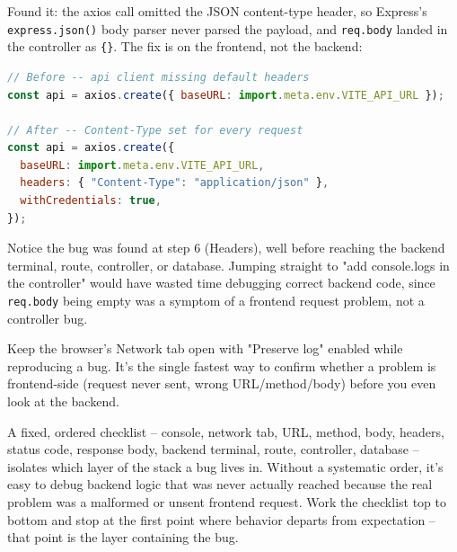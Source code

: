 Found it: the axios call omitted the JSON content-type header, so Express's
\texttt{express.json()} body parser never parsed the payload, and
\texttt{req.body} landed in the controller as \texttt{\{\}}. The fix is on
the frontend, not the backend:

\begin{lstlisting}[language=JavaScript]
// Before -- api client missing default headers
const api = axios.create({ baseURL: import.meta.env.VITE_API_URL });

// After -- Content-Type set for every request
const api = axios.create({
  baseURL: import.meta.env.VITE_API_URL,
  headers: { "Content-Type": "application/json" },
  withCredentials: true,
});
\end{lstlisting}

\begin{warnbox}[WARNING]
Notice the bug was found at step 6 (Headers), well before reaching the
backend terminal, route, controller, or database. Jumping straight to
"add console.logs in the controller" would have wasted time debugging
correct backend code, since \texttt{req.body} being empty was a symptom of
a frontend request problem, not a controller bug.
\end{warnbox}

\begin{tipbox}[TIP]
Keep the browser's Network tab open with "Preserve log" enabled while
reproducing a bug. It's the single fastest way to confirm whether a
problem is frontend-side (request never sent, wrong URL/method/body) before
you even look at the backend.
\end{tipbox}

\whatwhyhow
{A fixed, ordered checklist -- console, network tab, URL, method, body, headers, status code, response body, backend terminal, route, controller, database -- isolates which layer of the stack a bug lives in.}
{Without a systematic order, it's easy to debug backend logic that was never actually reached because the real problem was a malformed or unsent frontend request.}
{Work the checklist top to bottom and stop at the first point where behavior departs from expectation -- that point is the layer containing the bug.}

